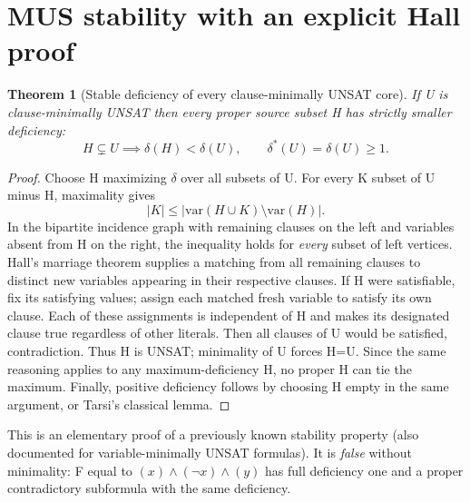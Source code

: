 \documentclass[11pt]{article}
\newtheorem{theorem}{Theorem}
\begin{document}
\section*{MUS stability with an explicit Hall proof}
\begin{theorem}[Stable deficiency of every clause-minimally UNSAT core]
If U is clause-minimally UNSAT then every proper source subset H has strictly smaller deficiency:
\[
\boxed{H\subsetneq U\implies\delta(H)<\delta(U),\qquad\delta^*(U)=\delta(U)\ge1.}
\]
\end{theorem}
\begin{proof}
Choose H maximizing $\delta$ over all subsets of U. For every K subset of U minus H, maximality gives
\[
|K|\le|\mathrm{var}(H\cup K)\setminus\mathrm{var}(H)|.
\]
In the bipartite incidence graph with remaining clauses on the left and variables absent from H on the right, the inequality holds for \emph{every} subset of left vertices. Hall's marriage theorem supplies a matching from all remaining clauses to distinct new variables appearing in their respective clauses. If H were satisfiable, fix its satisfying values; assign each matched fresh variable to satisfy its own clause. Each of these assignments is independent of H and makes its designated clause true regardless of other literals. Then all clauses of U would be satisfied, contradiction. Thus H is UNSAT; minimality of U forces H=U. Since the same reasoning applies to any maximum-deficiency H, no proper H can tie the maximum. Finally, positive deficiency follows by choosing H empty in the same argument, or Tarsi's classical lemma.
\end{proof}
\noindent This is an elementary proof of a previously known stability property (also documented for variable-minimally UNSAT formulas). It is \emph{false} without minimality: F equal to $(x)\land(\neg x)\land(y)$ has full deficiency one and a proper contradictory subformula with the same deficiency.
\end{document}
